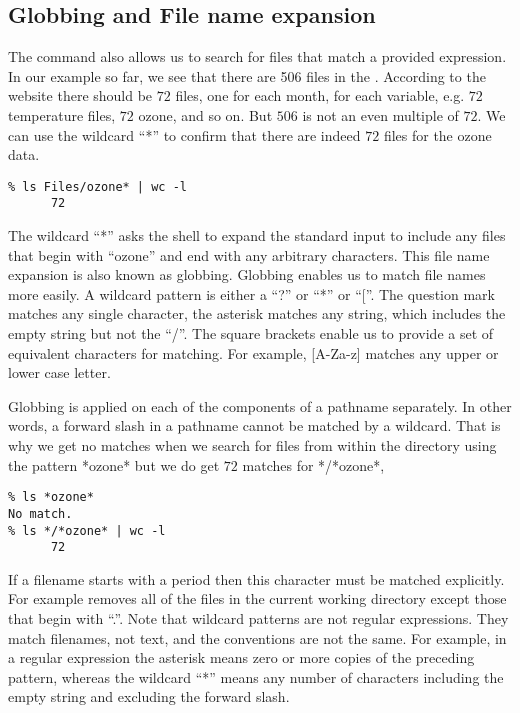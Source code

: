 \subsection{Globbing and File name expansion}
The  command also allows us to search
for files that match a provided expression.  In our example so far, we see
that there are 506 files in the .  According to the
website there should be $72$ files, one for each month, for each
variable, e.g. $72$ temperature files, $72$ ozone, and so on.  But
$506$ is not an even multiple of $72$.  We can use the wildcard ``*''
to confirm that there are indeed $72$ files for the ozone data.
\begin{verbatim}
% ls Files/ozone* | wc -l
      72
\end{verbatim}
The wildcard ``*'' asks the shell to expand the standard input to
include any files that begin with ``ozone'' and end with any arbitrary
characters.  This file name expansion is also known as globbing.  Globbing
enables us to match file names more easily.  A wildcard pattern is
either a ``?'' or  ``*'' or ``[''.  The question mark matches any
single character, the asterisk matches any string, which includes the
empty string but not the ``/''.  The square brackets
enable us to provide a set of equivalent characters for matching.  For
example, [A-Za-z] matches any upper or lower case letter.

Globbing is applied on each of the components of a pathname
separately. In other words, a forward slash in a pathname cannot be
matched by a wildcard. 
That is why we get no matches when we search for files from within the
 directory using the pattern
*ozone* but we do get $72$ matches for */*ozone*,
\begin{verbatim}
% ls *ozone*
No match.
% ls */*ozone* | wc -l
      72
\end{verbatim} 


If a filename starts with a period then this character must be matched
explicitly.  For example  removes all of the files in the current
working directory except those that begin with ``.''.
Note that wildcard patterns are not regular expressions.  They match
filenames, not text, and the conventions are not the same.  For
example, in a regular expression the asterisk means zero or more
copies of the preceding pattern, whereas the wildcard ``*'' means any
number of characters including the empty string and excluding the
forward slash.


